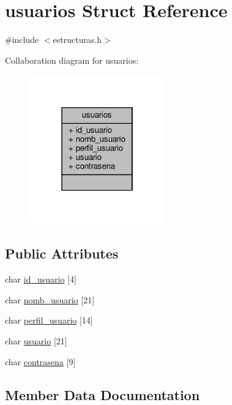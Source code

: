 \hypertarget{structusuarios}{}\section{usuarios Struct Reference}
\label{structusuarios}


{\ttfamily \#include $<$estructuras.\+h$>$}



Collaboration diagram for usuarios\+:\nopagebreak
\begin{figure}[H]
\begin{center}
\leavevmode
\includegraphics[width=166pt]{structusuarios__coll__graph}
\end{center}
\end{figure}
\subsection*{Public Attributes}
\begin{DoxyCompactItemize}
\item 
char \mbox{\hyperlink{structusuarios_a5090e2f56888f1a9873bd9ed35bf46d3}{id\+\_\+usuario}} \mbox{[}4\mbox{]}
\item 
char \mbox{\hyperlink{structusuarios_acf2d33748c720f047d2a0e512e187fd5}{nomb\+\_\+usuario}} \mbox{[}21\mbox{]}
\item 
char \mbox{\hyperlink{structusuarios_afe590222f989c0e30b72bbc0014868cc}{perfil\+\_\+usuario}} \mbox{[}14\mbox{]}
\item 
char \mbox{\hyperlink{structusuarios_a3330601c31921ae73c6fa7551a68a0da}{usuario}} \mbox{[}21\mbox{]}
\item 
char \mbox{\hyperlink{structusuarios_a0689cc96bd888f121b04e5c43d47a028}{contrasena}} \mbox{[}9\mbox{]}
\end{DoxyCompactItemize}


\subsection{Member Data Documentation}
\mbox{\label{structusuarios_a0689cc96bd888f121b04e5c43d47a028}} 
